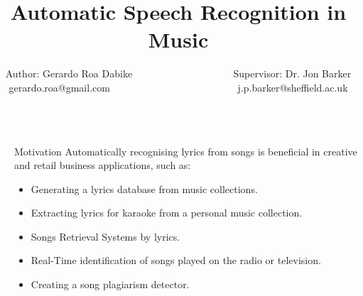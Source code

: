 \documentclass[final]{beamer}
\title{Automatic Speech Recognition \newline in Music} %
\author[Roa]{Author: Gerardo Roa Dabike ~~~~~~~~~~~~~~~~~~~ Supervisor: Dr. Jon Barker \newline \newline gerardo.roa@gmail.com~~~~~~~~~~~~~~~~~~~~~~~~~ j.p.barker@sheffield.ac.uk} %
\institute{Department of Computer Science} %
\newlength{\sepwid}
\newlength{\onecolwid}
\begin{document}

\setlength{\belowcaptionskip}{2ex} %
\setlength\belowdisplayshortskip{2ex} %

\begin{frame}[t] %

\begin{columns}[t] %

\begin{column}{\sepwid}\end{column} %

\begin{column}{\onecolwid} %


\begin{alertblock}{Motivation}
Automatically recognising lyrics from songs is beneficial in creative and retail business applications, such as:
\begin{itemize}
\item Generating a lyrics database from music collections.
\item Extracting lyrics for karaoke from a personal music collection. 
\item Songs Retrieval Systems by lyrics.

\item Real-Time identification of songs played on the radio or television.
\item Creating a song plagiarism detector.
\end{itemize}

\end{alertblock}



\end{column}
\end{columns}
\end{frame}
\end{document}
